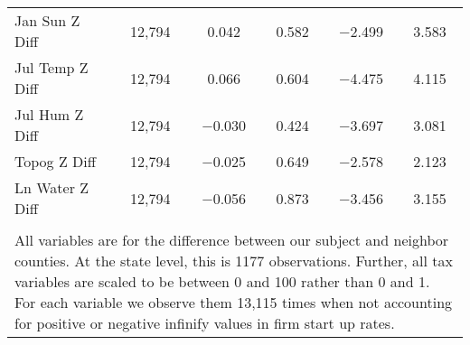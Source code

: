 \begin{table}[!htbp]
\begin{tabular}{@{\extracolsep{5pt}}lccccc}
Jan Sun Z Diff & 12,794 & 0.042 & 0.582 & $-$2.499 & 3.583 \\ 
Jul Temp Z Diff & 12,794 & 0.066 & 0.604 & $-$4.475 & 4.115 \\ 
Jul Hum Z Diff & 12,794 & $-$0.030 & 0.424 & $-$3.697 & 3.081 \\ 
Topog Z Diff & 12,794 & $-$0.025 & 0.649 & $-$2.578 & 2.123 \\ 
Ln Water Z Diff & 12,794 & $-$0.056 & 0.873 & $-$3.456 & 3.155 \\ 
\hline \\[-1.8ex] 
\multicolumn{6}{l}{All variables are for the difference between our subject and neighbor counties. At the state level, this is 1177 observations. Further, all tax variables are scaled to be between 0 and 100 rather than 0 and 1. For each variable we observe them 13,115 times when not accounting for positive or negative infinify values in firm start up rates.} \\ 
\end{tabular} 
\end{table} 

